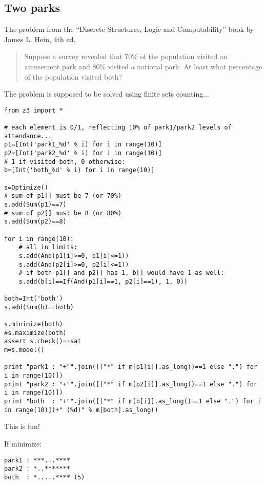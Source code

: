 \subsection{Two parks}

The problem from the ``Discrete Structures, Logic and Computability'' book by James L. Hein, 4th ed.

\begin{framed}
\begin{quotation}

Suppose a survey revealed that 70\% of the population visited
an amusement park and 80\% visited a national park.
At least what percentage of the population visited both?

\end{quotation}
\end{framed}

The problem is supposed to be solved using finite sets counting...

\begin{lstlisting}[style=custompy]
from z3 import *

# each element is 0/1, reflecting 10% of park1/park2 levels of attendance...
p1=[Int('park1_%d' % i) for i in range(10)]
p2=[Int('park2_%d' % i) for i in range(10)]
# 1 if visited both, 0 otherwise:
b=[Int('both_%d' % i) for i in range(10)]

s=Optimize()
# sum of p1[] must be 7 (or 70%)
s.add(Sum(p1)==7)
# sum of p2[] must be 8 (or 80%)
s.add(Sum(p2)==8)

for i in range(10):
    # all in limits:
    s.add(And(p1[i]>=0, p1[i]<=1))
    s.add(And(p2[i]>=0, p2[i]<=1))
    # if both p1[] and p2[] has 1, b[] would have 1 as well:
    s.add(b[i]==If(And(p1[i]==1, p2[i]==1), 1, 0))

both=Int('both')
s.add(Sum(b)==both)

s.minimize(both)
#s.maximize(both)
assert s.check()==sat
m=s.model()

print "park1 : "+"".join([("*" if m[p1[i]].as_long()==1 else ".") for i in range(10)])
print "park2 : "+"".join([("*" if m[p2[i]].as_long()==1 else ".") for i in range(10)])
print "both  : "+"".join([("*" if m[b[i]].as_long()==1 else ".") for i in range(10)])+" (%d)" % m[both].as_long()
\end{lstlisting}

This is fun!

If minimize:

\begin{lstlisting}
park1 : ***...****
park2 : *..*******
both  : *.....**** (5)
\end{lstlisting}

